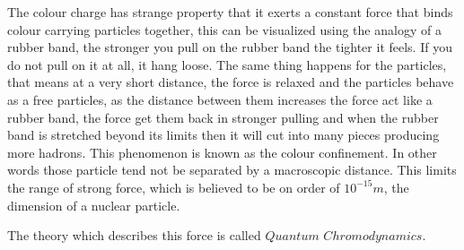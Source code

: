 The colour charge has strange property that it exerts a constant force that binds colour carrying particles together, this can be visualized using the analogy of a rubber band, the stronger you pull on the rubber band the tighter it feels.
If you do not pull on it at all, it hang loose.
The same thing happens for the particles,  that   means at a very short distance, the force is relaxed and the particles behave as a free particles,
as the distance between them increases the force act
like a rubber band, the force get
them back in stronger pulling
and when the rubber band is stretched beyond its limits then it will cut into many pieces producing more hadrons.
This phenomenon is known as the colour confinement. In other words those particle
tend not be
separated by a macroscopic distance.
This limits the range of strong force, which is believed to be on order of $10^{-15}m$,
the dimension of a nuclear particle.

The theory which describes this force is called $Quantum$ $Chromodynamics$.
